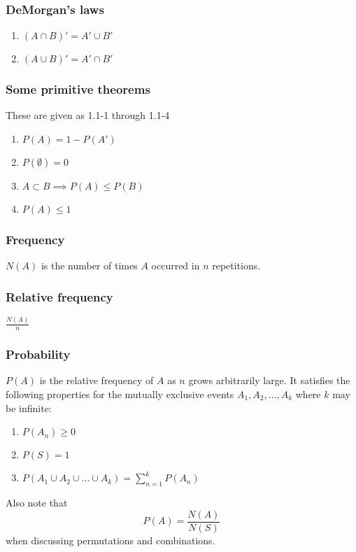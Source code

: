\documentclass{article}
\begin{document}
\begin{multicols*}{2}
\subsubsection{DeMorgan's laws}
\begin{enumerate}
    \item $(A \cap B)' = A' \cup B'$
    \item $(A \cup B)' = A' \cap B'$
\end{enumerate}

\subsubsection{Some primitive theorems}
These are given as 1.1-1 through 1.1-4
\begin{enumerate}
    \item $P(A) = 1 - P(A')$
    \item $P(\emptyset) = 0$
    \item $A \subset B \implies P(A) \leq P(B)$
    \item $P(A) \leq 1$
\end{enumerate}

\subsubsection{Frequency}
$N(A)$ is the number of times $A$ occurred in $n$ repetitions.

\subsubsection{Relative frequency}
$\frac{N(A)}{n}$

\subsubsection{Probability}
$P(A)$ is the relative frequency of $A$ as $n$ grows arbitrarily large. It satisfies the following properties for the mutually exclusive events $A_1, A_2, \ldots, A_k$ where $k$ may be infinite:
\begin{enumerate}
    \item $P(A_n) \geq 0$
    \item $P(S) = 1$
    \item $P(A_1 \cup A_2 \cup \ldots \cup A_k) = \sum_{n=1}^k{P(A_n)}$
\end{enumerate}

Also note that
\[P(A) = \frac{N(A)}{N(S)}\]
when discussing permutations and combinations.


\end{multicols*}
\end{document}
